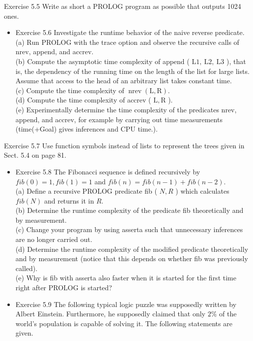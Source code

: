 \documentclass[10pt]{article}
\begin{document}
Exercise 5.5 Write as short a PROLOG program as possible that outputs 1024 ones.

\begin{itemize}
  \item Exercise 5.6 Investigate the runtime behavior of the naive reverse predicate.\\
(a) Run PROLOG with the trace option and observe the recursive calls of nrev, append, and accrev.\\
(b) Compute the asymptotic time complexity of append ( $\mathrm{L} 1, \mathrm{~L} 2, \mathrm{~L} 3$ ), that is, the dependency of the running time on the length of the list for large lists. Assume that access to the head of an arbitrary list takes constant time.\\
(c) Compute the time complexity of $\operatorname{nrev}(\mathrm{L}, \mathrm{R})$.\\
(d) Compute the time complexity of accrev ( $\mathrm{L}, \mathrm{R}$ ).\\
(e) Experimentally determine the time complexity of the predicates nrev, append, and accrev, for example by carrying out time measurements (time(+Goal) gives inferences and CPU time.).
\end{itemize}

Exercise 5.7 Use function symbols instead of lists to represent the trees given in Sect. 5.4 on page 81.

\begin{itemize}
  \item Exercise 5.8 The Fibonacci sequence is defined recursively by $f i b(0)=1, f i b(1)=1$ and $f i b(n)=f i b(n-1)+f i b(n-2)$.\\
(a) Define a recursive PROLOG predicate fib ( $N, R$ ) which calculates $f i b(N)$ and returns it in $R$.\\
(b) Determine the runtime complexity of the predicate fib theoretically and by measurement.\\
(c) Change your program by using asserta such that unnecessary inferences are no longer carried out.\\
(d) Determine the runtime complexity of the modified predicate theoretically and by measurement (notice that this depends on whether fib was previously called).\\
(e) Why is fib with asserta also faster when it is started for the first time right after PROLOG is started?
  \item Exercise 5.9 The following typical logic puzzle was supposedly written by Albert Einstein. Furthermore, he supposedly claimed that only $2 \%$ of the world's population is capable of solving it. The following statements are given.
\end{itemize}
\end{document}
